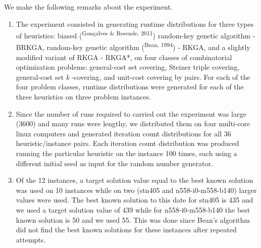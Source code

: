 \begin{multicols}{2}
\par{}We make the following remarks about the experiment.\allowbreak{}
\begin{enumerate}[label=\textbullet,leftmargin=*]
\item \par{}The experiment consisted in generating runtime distributions for three types of heuristics:\allowbreak{} biased (\allowbreak{}\textsuperscript{Gonçalves \&\allowbreak{\allowbreak{}\allowbreak{}}\allowbreak{} Resende,\allowbreak{} 2011})\allowbreak{} random-\allowbreak{}key genetic algorithm -\allowbreak{} BRKGA,\allowbreak{} random-\allowbreak{}key genetic algorithm (\allowbreak{}\textsuperscript{Bean,\allowbreak{} 1994})\allowbreak{} -\allowbreak{} RKGA,\allowbreak{} and a slightly modified variant of RKGA -\allowbreak{} RKGA*\allowbreak{},\allowbreak{} on four classes of combinatorial optimization problems:\allowbreak{} general-\allowbreak{}cost set covering,\allowbreak{} Steiner triple covering,\allowbreak{} general-\allowbreak{}cost set \textit{k} -\allowbreak{}covering,\allowbreak{} and unit-\allowbreak{}cost covering by pairs.\allowbreak{} For each of the four problem classes,\allowbreak{} runtime distributions were generated for each of the three heuristics on three problem instances.\allowbreak{}
\item \par{}Since the number of runs required to carried out the experiment was large (\allowbreak{}3600)\allowbreak{} and many runs were lengthy,\allowbreak{} we distributed them on four multi-\allowbreak{}core linux computers and generated iteration count distributions for all 36 heuristic\fshyp{}instance pairs.\allowbreak{} Each iteration count distribution was produced running the particular heuristic on the instance 100 times,\allowbreak{} each using a different initial seed as input for the random number generator.\allowbreak{}
\item \par{}Of the 12 instances,\allowbreak{} a target solution value equal to the best known solution was used on 10 instances while on two (\allowbreak{}stn405 and n558-\allowbreak{}i0-\allowbreak{}m558-\allowbreak{}b140)\allowbreak{} larger values were used.\allowbreak{} The best known solution to this date for stn405 is 435 and we used a target solution value of 439 while for n558-\allowbreak{}i0-\allowbreak{}m558-\allowbreak{}b140 the best known solution is 50 and we used 55.\allowbreak{} This was done since Bean's algorithm did not find the best known solutions for these instances after repeated attempts.\allowbreak{}

\end{enumerate}
\end{multicols}
